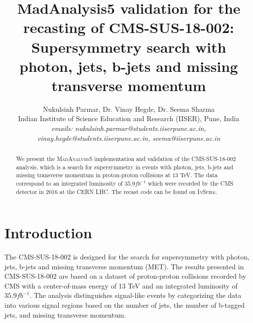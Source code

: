 \documentclass[a4paper, 10pt]{article}
\begin{document}
\title{MadAnalysis5 validation for the recasting of CMS-SUS-18-002: Supersymmetry search with photon, jets, b-jets and missing transverse momentum}

\author{Nukulsinh Parmar, Dr. Vinay Hegde, Dr. Seema Sharma \\ \normalsize Indian Institute of Science Education and Research (IISER), Pune, India \\
\normalsize \textit{emails: nukulsinh.parmar@students.iiserpune.ac.in, vinay.hegde@students.iiserpune.ac.in, seema@iiserpune.ac.in }}


\date{}

\maketitle


\begin{abstract}

\noindent
   We present the \textsc{MadAnalysis5} implementation and validation of the CMS-SUS-18-002 analysis, which is a search for supersymmetry in events with photon, jets, b-jets and missing transverse momentum in proton-proton collisions at 13 TeV\cite{paper}. The data correspond to an integrated luminosity of $35.9 fb^{-1}$ which were recorded by the CMS detector in 2016 at the CERN LHC. The recast code can be found on \textsc{InSpire}.
\end{abstract}

\tableofcontents


\section{Introduction}
\paragraph{}
The CMS-SUS-18-002 \cite{paper} is designed for the search for supersymmetry with photon, jets, b-jets and missing transverse momentum (MET). The results presented in CMS-SUS-18-002 are based on a dataset of proton-proton collisions recorded by CMS with a center-of-mass energy of 13 TeV and an integrated luminosity of $35.9 fb^{-1}$. The analysis distinguishes signal-like events by categorizing the data into various signal regions based on the number of jets, the number of b-tagged jets, and missing transverse momentum. 
\\
\end{document}
